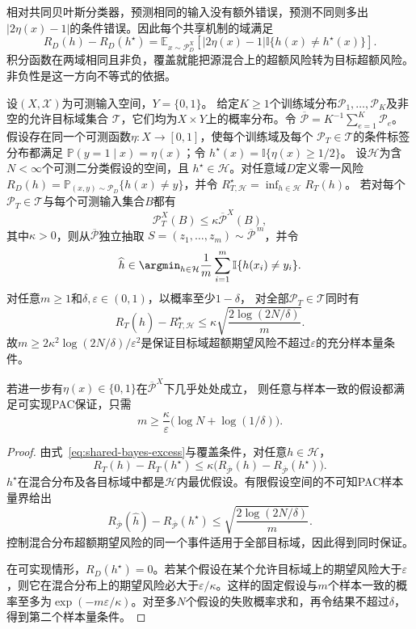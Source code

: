 相对共同贝叶斯分类器，预测相同的输入没有额外错误，预测不同则多出$|2\eta(x)-1|$的条件错误。因此每个共享机制的域满足
\begin{equation}
 R_D(h)-R_D(h^\star)
 =\mathbb E_{x\sim\mathcal P_D^X}
   [|2\eta(x)-1|\mathbb I\{h(x)\neq h^\star(x)\}].
 \label{eq:shared-bayes-excess}
\end{equation}
积分函数在两域相同且非负，覆盖就能把源混合上的超额风险转为目标超额风险。非负性是这一方向不等式的依据。

\begin{theorem}[共享标签机制下的领域泛化]
\label{thm:dg-shared-pac}
设$(X,\mathcal X)$为可测输入空间，$Y=\{0,1\}$。
给定$K\geq1$个训练域分布$\mathcal P_1,\ldots,\mathcal P_K$及非空的允许目标域集合
$\mathcal T$，它们均为$X\times Y$上的概率分布。令
$\overline{\mathcal P}=K^{-1}\sum_{e=1}^K\mathcal P_e$。
假设存在同一个可测函数$\eta:X\to[0,1]$，使每个训练域及每个
$\mathcal P_T\in\mathcal T$的条件标签分布都满足
$\mathbb P(y=1\mid x)=\eta(x)$；令
$h^\star(x)=\mathbb I\{\eta(x)\geq1/2\}$。
设$\mathcal H$为含$N<\infty$个可测二分类假设的空间，且
$h^\star\in\mathcal H$。对任意域$D$定义零一风险
$R_D(h)=\mathbb P_{(x,y)\sim\mathcal P_D}\{h(x)\neq y\}$，并令
$R_{T,\mathcal H}^{\star}=\inf_{h\in\mathcal H}R_T(h)$。
若对每个$\mathcal P_T\in\mathcal T$与每个可测输入集合$B$都有
\[
 \mathcal P_T^X(B)\leq\kappa\overline{\mathcal P}^{X}(B),
\]
其中$\kappa>0$，则从$\overline{\mathcal P}$独立抽取
$S=(z_1,\ldots,z_m)\sim\overline{\mathcal P}^{\,m}$，并令
\[
 \widehat h\in\argmin_{h\in\mathcal H}
 \frac1m\sum_{i=1}^m\mathbb I\{h(x_i)\neq y_i\}.
\]
对任意$m\geq1$和$\delta,\varepsilon\in(0,1)$，以概率至少$1-\delta$，
对全部$\mathcal P_T\in\mathcal T$同时有
\begin{equation}
 R_T(\widehat h)-R_{T,\mathcal H}^{\star}
 \leq\kappa\sqrt{\frac{2\log(2N/\delta)}{m}}.
 \label{eq:dg-shared-pac}
\end{equation}
故$m\geq2\kappa^2\log(2N/\delta)/\varepsilon^2$是保证目标域超额期望风险不超过$\varepsilon$的充分样本量条件。

若进一步有$\eta(x)\in\{0,1\}$在$\overline{\mathcal P}^X$下几乎处处成立，
则任意与样本一致的假设都满足可实现PAC保证，只需
\[
 m\geq\frac{\kappa}{\varepsilon}
       \bigl(\log N+\log(1/\delta)\bigr).
\]
\end{theorem}
\begin{proof}
由式~\eqref{eq:shared-bayes-excess}与覆盖条件，对任意$h\in\mathcal H$，
\[
 R_T(h)-R_T(h^\star)
 \leq\kappa\bigl(R_{\overline{\mathcal P}}(h)
                  -R_{\overline{\mathcal P}}(h^\star)\bigr).
\]
$h^\star$在混合分布及各目标域中都是$\mathcal H$内最优假设。有限假设空间的不可知PAC样本量界给出
\[
 R_{\overline{\mathcal P}}(\widehat h)
 -R_{\overline{\mathcal P}}(h^\star)
 \leq\sqrt{\frac{2\log(2N/\delta)}{m}}.
\]
控制混合分布超额期望风险的同一个事件适用于全部目标域，因此得到同时保证。

在可实现情形，$R_D(h^\star)=0$。若某个假设在某个允许目标域上的期望风险大于$\varepsilon$，则它在混合分布上的期望风险必大于$\varepsilon/\kappa$。这样的固定假设与$m$个样本一致的概率至多为$\exp(-m\varepsilon/\kappa)$。对至多$N$个假设的失败概率求和，再令结果不超过$\delta$，得到第二个样本量条件。
\end{proof}

